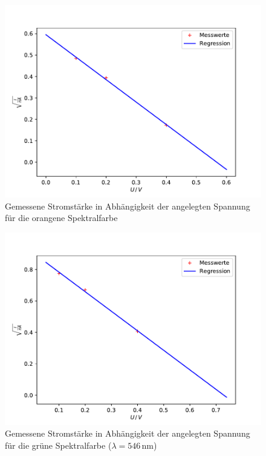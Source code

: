 \begin{figure}
  \centering
  \includegraphics[scale=0.7]{orange.pdf}
  \caption{Gemessene Stromstärke in Abhängigkeit der angelegten Spannung für die orangene Spektralfarbe}
  \label{fig:o}
\end{figure}
\begin{figure}
  \centering
  \includegraphics[scale=0.7]{grün.pdf}
  \caption{Gemessene Stromstärke in Abhängigkeit der angelegten Spannung für die grüne Spektralfarbe ($\lambda=546$\,$\si{\nano\meter}$)}
  \label{fig:g}
\end{figure}
